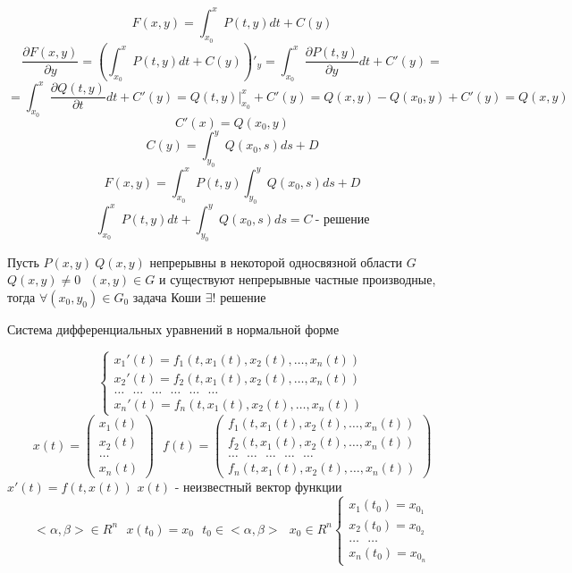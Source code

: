 \begin{block}
  $$
  F(x, y) = \int_{x_0}^x P(t, y)dt + C(y)
  $$
  $$
  \frac{\partial F(x, y)}{\partial y} =
  \left( \int_{x_0}^x P(t, y)dt + C(y) \right)'_y =
  \int_{x_0}^x \frac{\partial P(t, y)}{\partial y} dt + C'(y) =
  $$
  $$
  = \int_{x_0}^x \frac{\partial Q(t, y)}{\partial t} dt + C'(y) =
  Q(t, y)|_{x_0}^x + C'(y) = Q(x, y) - Q(x_0, y) + C'(y) = Q(x, y)
  $$
  $$
  C'(x) = Q(x_0, y)
  $$
  $$
  C(y) = \int_{y_0}^y Q(x_0, s) ds + D
  $$
  $$
  F(x, y) = \int_{x_0}^x P(t, y) \int_{y_0}^y Q(x_0, s) ds + D
  $$
  $$
  \int_{x_0}^x P(t, y)dt + \int_{y_0}^y Q(x_0, s) ds = C ~ \text{- решение}
  $$
\end{block}

\begin{theorem}
  Пусть $P(x, y) ~ Q(x, y)$ непрерывны в некоторой односвязной области $G$
  $Q(x, y) \not= 0 ~~~ (x,y) \in G$ и существуют непрерывные частные
  производные, тогда $\forall (x_0, y_0) \in G_0$ задача Коши
  $\exists !$ решение
\end{theorem}

\begin{title}
  Система дифференциальных уравнений в нормальной форме
\end{title}

\begin{define}
  $$
  \left\{
  \begin{array}{l}
    x_1'(t) = f_1(t, x_1(t), x_2(t), \ldots, x_n(t)) \\
    x_2'(t) = f_2(t, x_1(t), x_2(t), \ldots, x_n(t)) \\
    \ldots ~~~ \ldots ~~~ \ldots ~~~ \ldots ~~~ \ldots ~~~ \ldots \\
    x_n'(t) = f_n(t, x_1(t), x_2(t), \ldots, x_n(t))
  \end{array}
  \right.
  $$
  $$
  x(t) =
  \left(
  \begin{array}{l}
    x_1(t) \\
    x_2(t) \\
    \ldots \\
    x_n(t)
  \end{array}
  \right) ~~~
  f(t) =
  \left(
  \begin{array}{l}
   f_1(t, x_1(t), x_2(t), \ldots, x_n(t)) \\
   f_2(t, x_1(t), x_2(t), \ldots, x_n(t)) \\
    \ldots ~~~ \ldots ~~~ \ldots ~~~ \ldots ~~~ \ldots \\
   f_n(t, x_1(t), x_2(t), \ldots, x_n(t))
  \end{array}
  \right)
  $$
  $x'(t) = f(t, x(t))$ $x(t)$ - неизвестный вектор функции
  $$
  <\alpha, \beta> \in R^n ~~~ x(t_0) = x_0 ~~~ t_0 \in <\alpha, \beta> ~~~
  x_0 \in R^n
  \left\{
  \begin{array}{l}
    x_1(t_0) = x_{0_1} \\
    x_2(t_0) = x_{0_2} \\
    \ldots ~~~ \ldots \\
    x_n(t_0) = x_{0_n}
  \end{array}
  \right.
  $$
\end{define}

